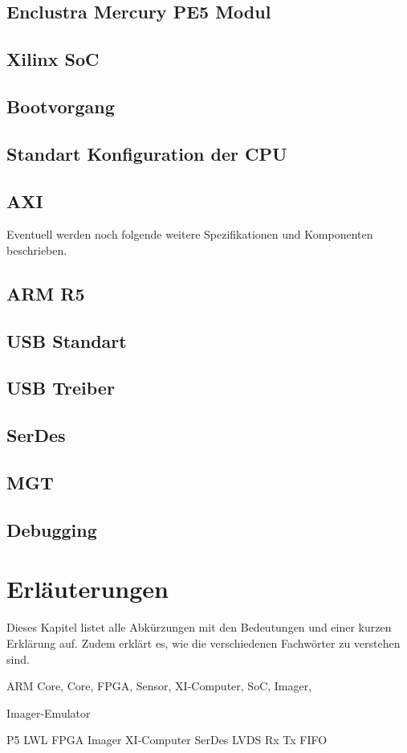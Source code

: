 \documentclass{article}
\begin{document}
\subsection{Enclustra Mercury PE5 Modul}
\subsection{Xilinx SoC}
\subsection{Bootvorgang}
\subsection{Standart Konfiguration der CPU}
\subsection{AXI}

Eventuell werden noch folgende weitere Spezifikationen und Komponenten be\-schrieben.
\subsection{ARM R5}
\subsection{USB Standart}
\subsection{USB Treiber}
\subsection{SerDes}
\subsection{MGT}
\subsection{Debugging}

\section{Erläuterungen}
Dieses Kapitel listet alle Abkürzungen mit den Bedeutungen und einer kurzen Erklärung auf. Zudem erklärt es, wie die verschiedenen Fachwörter zu verstehen sind.

ARM Core,
Core,
FPGA,
Sensor,
XI-Computer,
SoC,
Imager,

Imager-Emulator

P5
LWL
FPGA
Imager
XI-Computer
SerDes
LVDS
Rx
Tx
FIFO
\end{document}
